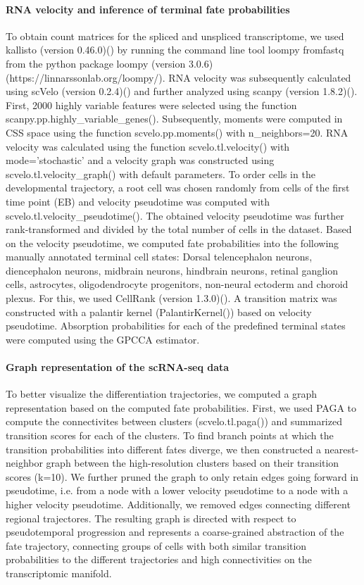 \paragraph{RNA velocity and inference of terminal fate probabilities}
To obtain count matrices for the spliced and unspliced transcriptome, we used kallisto (version 0.46.0)(\cite{bray_near-optimal_2016}) by running the command line tool loompy fromfastq  from the python package loompy (version 3.0.6)(https://linnarssonlab.org/loompy/). RNA velocity was subsequently calculated using scVelo (version 0.2.4)(\cite{bergen_generalizing_2020}) and further analyzed using scanpy (version 1.8.2)(\cite{wolf_scanpy_2018}). First, 2000 highly variable features were selected using the function scanpy.pp.highly\_variable\_genes(). Subsequently, moments were computed in CSS space using the function scvelo.pp.moments() with n\_neighbors=20. RNA velocity was calculated using the function scvelo.tl.velocity() with mode='stochastic' and a velocity graph was constructed using scvelo.tl.velocity\_graph() with default parameters. To order cells in the developmental trajectory, a root cell was chosen randomly from cells of the first time point (EB) and velocity pseudotime was computed with scvelo.tl.velocity\_pseudotime().  The obtained velocity pseudotime was further rank-transformed and divided by the total number of cells in the dataset. Based on the velocity pseudotime, we computed fate probabilities into the following manually annotated terminal cell states: Dorsal telencephalon neurons, diencephalon neurons, midbrain neurons, hindbrain neurons, retinal ganglion cells, astrocytes, oligodendrocyte progenitors, non-neural ectoderm and choroid plexus. For this, we used CellRank (version 1.3.0)(\cite{lange_cellrank_2022}). A transition matrix was constructed with a palantir kernel (PalantirKernel()) based on velocity pseudotime. Absorption probabilities for each of the predefined terminal states were computed using the GPCCA estimator.


\paragraph{Graph representation of the scRNA-seq data}
To better visualize the differentiation trajectories, we computed a graph representation based on the computed fate probabilities. First, we used PAGA to compute the connectivites between clusters (scvelo.tl.paga()) and summarized transition scores for each of the clusters. To find branch points at which the transition probabilities into different fates diverge, we then constructed a nearest-neighbor graph between the high-resolution clusters based on their transition scores (k=10). We further pruned the graph to only retain edges going forward in pseudotime, i.e. from a node with a lower velocity pseudotime to a node with a higher velocity pseudotime. Additionally, we removed edges connecting different regional trajectores. The resulting graph is directed with respect to pseudotemporal progression and represents a coarse-grained abstraction of the fate trajectory, connecting groups of cells with both similar transition probabilities to the different trajectories and high connectivities on the transcriptomic manifold. 


